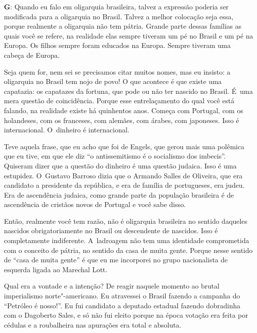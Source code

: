  

\textbf{G}: Quando eu falo em oligarquia brasileira, talvez a expressão
poderia ser modificada para a oligarquia no Brasil. Talvez a melhor
colocação seja essa, porque realmente a oligarquia não tem pátria.
Grande parte dessas famílias as quais você se refere, na realidade elas
sempre tiveram um pé no Brasil e um pé na Europa. Os filhos sempre foram
educados na Europa. Sempre tiveram uma cabeça de Europa.

 

Seja quem for, nem sei se precisamos citar muitos nomes, mas eu insisto:
a oligarquia no Brasil tem nojo de povo! O que acontece é que existe uma
capatazia: os capatazes da fortuna, que pode ou não ter nascido no
Brasil. É~uma mera questão de coincidência. Porque esse entrelaçamento
do qual você está falando, na realidade existe há quinhentos anos. Começa
com Portugal, com os holandeses, com os franceses, com alemães, com
árabes, com japoneses. Isso é internacional. O~dinheiro é internacional.

 

Teve aquela frase, que eu acho que foi de Engels, que gerou mais uma
polêmica que eu tive, em que ele diz ``o antissemitismo é o socialismo
dos imbecis''. Quiseram dizer que a questão do dinheiro é uma questão
judaica. Isso é uma estupidez. O~Gustavo Barroso dizia que o Armando
Salles de Oliveira, que era candidato a presidente da república, e era
de família de portugueses, era judeu. Era de ascendência judaica, como
grande parte da população brasileira é de ascendência de cristãos novos
de Portugal e você sabe disso.

 

Então, realmente você tem razão, não é oligarquia brasileira no sentido
daqueles nascidos obrigatoriamente no Brasil ou descendente de nascidos.
Isso é completamente indiferente. A~ladroagem não tem uma identidade
comprometida com o conceito de pátria, no sentido da casa de muita
gente. Porque nesse sentido de ``casa de muita gente'' é que eu me
incorporei no grupo nacionalista de esquerda ligada ao Marechal Lott.

 

Qual era a vontade e a intenção? De reagir naquele momento ao brutal
imperialismo norte"-americano. Eu atravessei o Brasil fazendo a campanha
do ``Petróleo é nosso!''. Eu fui candidato a deputado estadual fazendo
dobradinha com o Dagoberto Sales, e só não fui eleito porque na época
votação era feita por cédulas e a roubalheira nas apurações era total e
absoluta.

